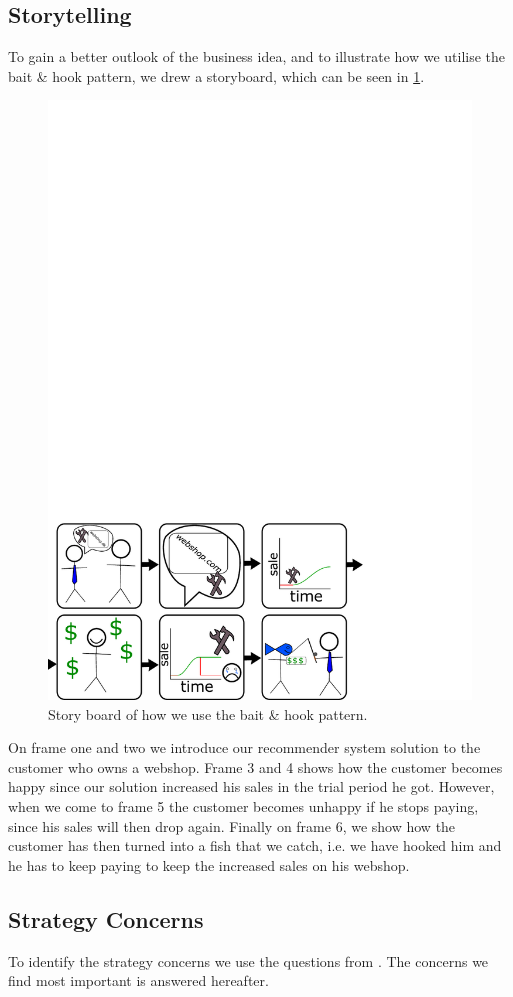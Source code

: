 \subsection{Storytelling}
To gain a better outlook of the business idea, and to illustrate how we utilise the bait \& hook pattern, we drew a storyboard, which can be seen in \cref{fig:drawing}.

\begin{figure}
	\centering
	\includegraphics[width=0.7\linewidth]{figures/drawing}
	\caption{Story board of how we use the bait \& hook pattern.}
	\label{fig:drawing}
\end{figure}
 
 On frame one and two we introduce our recommender system solution to the customer who owns a webshop.
 Frame 3 and 4 shows how the customer becomes happy since our solution increased his sales in the trial period he got.
 However, when we come to frame 5 the customer becomes unhappy if he stops paying, since his sales will then drop again.
 Finally on frame 6, we show how the customer has then turned into a fish that we catch, i.e. we have hooked him and he has to keep paying to keep the increased sales on his webshop.
 
\subsection{Strategy Concerns}
To identify the strategy concerns we use the questions from \citet[pg. 202-208]{osterwalder2010business}.
The concerns we find most important is answered hereafter.

